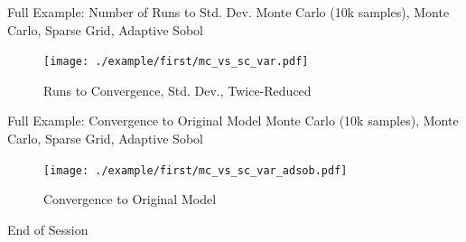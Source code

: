 \documentclass[t,9pt,svgnames]{beamer}
\begin{document}
\begin{frame}[fragile]{Full Example: Number of Runs to Std. Dev.}
  \color{magenta} Monte Carlo (10k samples),
  \color{blue} Monte Carlo,
  \color{ForestGreen} Sparse Grid,
  \color{red} Adaptive Sobol
      \begin{figure}
        \centering
        \texttt{[image: ./example/first/mc\_vs\_sc\_var.pdf]}
        \caption{Runs to Convergence, Std. Dev., Twice-Reduced}
      \end{figure}
\end{frame}

\begin{frame}[fragile]{Full Example: Convergence to Original Model}
  \color{magenta} Monte Carlo (10k samples),
  \color{blue} Monte Carlo,
  \color{ForestGreen} Sparse Grid,
  \color{red} Adaptive Sobol
      \begin{figure}
        \centering
        \texttt{[image: ./example/first/mc\_vs\_sc\_var\_adsob.pdf]}
        \caption{Convergence to Original Model}
      \end{figure}
\end{frame}

\begin{frame}{End of Session}
\end{frame}
\end{document}
